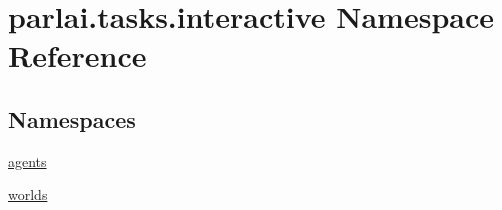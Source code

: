 \hypertarget{namespaceparlai_1_1tasks_1_1interactive}{}\section{parlai.\+tasks.\+interactive Namespace Reference}
\label{namespaceparlai_1_1tasks_1_1interactive}
\subsection*{Namespaces}
\begin{DoxyCompactItemize}
\item 
 \hyperlink{namespaceparlai_1_1tasks_1_1interactive_1_1agents}{agents}
\item 
 \hyperlink{namespaceparlai_1_1tasks_1_1interactive_1_1worlds}{worlds}
\end{DoxyCompactItemize}
